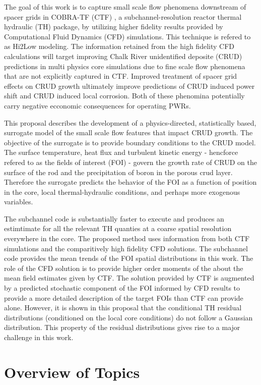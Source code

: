 The goal of this work is to capture small scale flow phenomena downstream of
spacer grids in COBRA-TF (CTF) \cite{salko12}, a subchannel-resolution reactor
thermal hydraulic (TH) package, by utilizing higher fidelity results provided
by Computational Fluid Dynamics (CFD) simulations.  This technique is refered to as Hi2Low modeling.  
The information retained from the high
fidelity CFD calculations will target improving Chalk River unidentified deposite (CRUD) predictions in
multi physics core simulations due to fine scale flow phenomena that are not
explicitly captured in CTF.  
Improved treatment of spacer grid
effects on CRUD growth ultimately improve predictions of CRUD induced power shift
and CRUD induced local corrosion.  Both of these phenomina potentially carry negative ecconomic consequences for operating PWRs.

This proposal describes the development of a physics-directed, statistically
based, surrogate model of the small scale flow features that impact CRUD
growth.   
The objective of the surrogate is to provide boundary conditions to the CRUD
model.  The surface temperature, heat flux and
turbulent kinetic energy - hencforce refered to as the fields of interest (FOI) - govern the growth rate of CRUD on the surface
of the rod and the precipitation of boron in the porous crud layer.
Therefore the surrogate predicts the behavior of the FOI as a function
of position in the core, local thermal-hydraulic conditions, and perhaps 
more exogenous variables. 

The subchannel code is substantially faster to execute and produces an estimtimate for
all the relevant TH quanties at a coarse spatial resolution everywhere in the core.  The proposed method uses information from both CTF simulations and the comparitively high fidelity CFD solutions.
The subchannel code provides the mean trends of the 
FOI spatial distributions in this work.  The role of the CFD solution is to provide
higher order moments of the about the mean field estimates given by CTF.  
The solution provided by CTF is augmented by a
predicted stochastic component of the FOI informed by CFD results to provide a more detailed description of
the target FOIs than CTF can provide alone.  However, it is shown in this proposal that the conditional TH residual distributions (conditioned on the local core conditions) do not follow a Gaussian distribution.  This property of
the residual distributions gives rise to a major challenge in this work.


\section{Overview of Topics}

